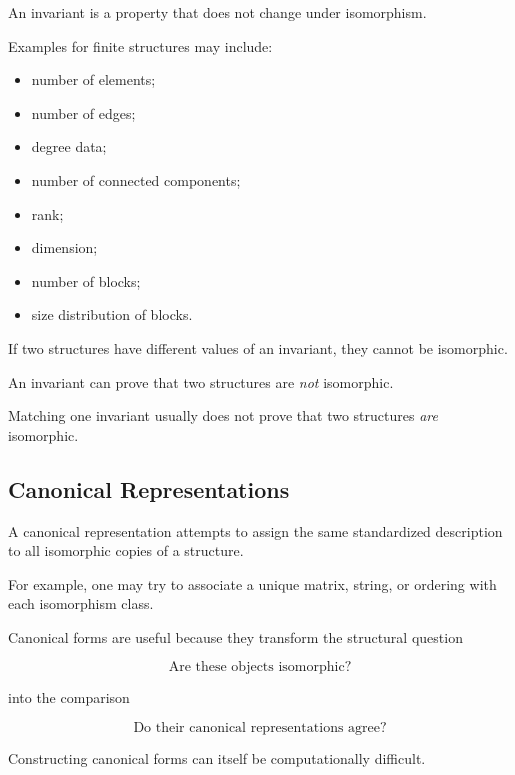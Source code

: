 An invariant is a property that does not change under isomorphism.

Examples for finite structures may include:

\begin{itemize}
    \item number of elements;
    \item number of edges;
    \item degree data;
    \item number of connected components;
    \item rank;
    \item dimension;
    \item number of blocks;
    \item size distribution of blocks.
\end{itemize}

If two structures have different values of an invariant, they cannot be
isomorphic.

\begin{importantbox}
An invariant can prove that two structures are \emph{not} isomorphic.

Matching one invariant usually does not prove that two structures
\emph{are} isomorphic.
\end{importantbox}

\subsection{Canonical Representations}
\label{subsec:canonical-representations}

A canonical representation attempts to assign the same standardized
description to all isomorphic copies of a structure.

For example, one may try to associate a unique matrix, string, or
ordering with each isomorphism class.

Canonical forms are useful because they transform the structural
question

\[
\text{Are these objects isomorphic?}
\]

into the comparison

\[
\text{Do their canonical representations agree?}
\]

Constructing canonical forms can itself be computationally difficult.

